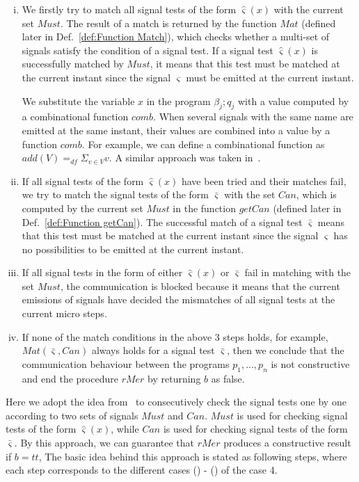 \documentclass{fcs}
\newcommand{\rmn}[1]{(\romannumeral#1)}
\newcommand{\sig}[0]{\varsigma}
\newcommand{\true}[0]{\mathit{tt}}
\DeclareMathOperator{\seq}{;}
\newcommand{\Must}[0]{\mathit{Must}}
\newcommand{\Match}[0]{\mathit{Mat}}
\newcommand{\rMerge}[0]{\mathit{rMer}}
\newcommand{\comb}[0]{\mathit{comb}}
\newcommand{\Can}[0]{\mathit{Can}}
\newcommand{\getCan}[0]{\mathit{getCan}}
\newcommand{\dddef}[0]{=_{df}}
\begin{document}
\begin{enumerate}[(i)]
\item We firstly try to match all signal tests of the form $\hat{\sig}(x)$ with the current set $\Must$.
The result of a match is returned by the function $\Match$ (defined later in Def.~\ref{def:Function Match}), which checks whether a multi-set of signals satisfy the condition of a signal test.
If a signal test $\hat{\sig}(x)$ is successfully matched by $\Must$, it means that this test must be matched at the current instant since the signal $\sig$ must be emitted at the current instant.

We substitute the variable $x$ in the program $\beta_j\seq q_j$ with a value computed by a combinational function $\comb$.
When several signals with the same name are emitted at the same instant, their values are combined into a value by a function $\comb$.
For example, we can define a combinational function as $\mathit{add}(V)\dddef \Sigma_{v\in V} v$.
A similar approach was taken in~\cite{???}.

\item If all signal tests of the form $\hat{\sig}(x)$ have been tried and their matches fail, we try to match the signal tests of the form $\bar{\sig}$ with the set $\Can$, which is computed by the current set $\Must$ in the function $\getCan$ (defined later in Def.~\ref{def:Function getCan}).
The successful match of a signal test $\bar{\sig}$ means that this test must be matched at the current instant since the signal $\sig$ has no possibilities to be emitted at the current instant.

\item If all signal tests in the form of either $\hat{\sig}(x)$ or $\bar{\sig}$ fail in matching with the set $\Must$,
the communication is blocked because it means that the current emissions of signals have decided the mismatches of all signal tests at the current micro steps.

\item If none of the match conditions in the above 3 steps holds, for example, $\Match(\bar{\sig}, \Can)$ always holds for a signal test $\bar{\sig}$,
then we conclude that the communication behaviour between the programs $p_1,...,p_n$ is not constructive and end the procedure $\rMerge$ by returning $b$ as false.


\end{enumerate}

\ifx
Here we adopt the idea from~\cite{???} to consecutively check the signal tests one by one according to two sets of signals $\Must$ and $\Can$.
$\Must$ is used for checking signal tests of the form $\hat{\sig}(x)$, while $\Can$ is used for checking signal tests of the form $\bar{\sig}$.
By this approach, we can guarantee that $\rMerge$ produces a constructive result if $b=\true$,
The basic idea behind this approach is stated as following steps, where each step corresponds to the different cases \rmn{1} - \rmn{4} of the case 4.
\fi
\end{document}

